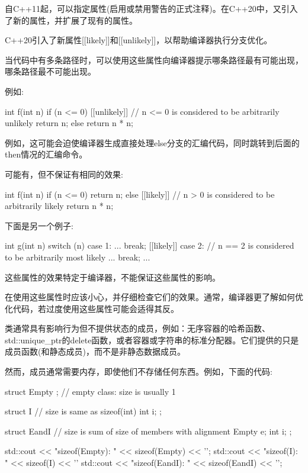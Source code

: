 
自C++11起，可以指定属性(启用或禁用警告的正式注释)。在C++20中，又引入了新的属性，并扩展了现有的属性。

\mySubsubsection{21.6.1}{属性[[likely]]和[unlikely]]}

C++20引入了新属性[[likely]]和[[unlikely]]，以帮助编译器执行分支优化。

当代码中有多条路径时，可以使用这些属性向编译器提示哪条路径最有可能出现，哪条路径最不可能出现。

例如:

\begin{cpp}
int f(int n)
{
	if (n <= 0) [[unlikely]] { // n <= 0 is considered to be arbitrarily unlikely
		return n;
	}
	else {
		return n * n;
	}
}
\end{cpp}

例如，这可能会迫使编译器生成直接处理else分支的汇编代码，同时跳转到后面的then情况的汇编命令。

可能有，但不保证有相同的效果:

\begin{cpp}
int f(int n)
{
	if (n <= 0) {
		return n;
	}
	else [[likely]] { // n > 0 is considered to be arbitrarily likely
		return n * n;
	}
}
\end{cpp}

下面是另一个例子:

\begin{cpp}
int g(int n)
{
	switch (n) {
		case 1:
		...
		break;
		[[likely]] case 2: // n == 2 is considered to be arbitrarily most likely
		...
		break;
	}
	...
}
\end{cpp}

这些属性的效果特定于编译器，不能保证这些属性的影响。

在使用这些属性时应该小心，并仔细检查它们的效果。通常，编译器更了解如何优化代码，若过度使用这些属性可能会适得其反。


类通常具有影响行为但不提供状态的成员，例如：无序容器的哈希函数、std::unique\_ptr的delete函数，或者容器或字符串的标准分配器。它们提供的只是成员函数(和静态成员)，而不是非静态数据成员。

然而，成员通常需要内存，即使他们不存储任何东西。例如，下面的代码:

\begin{cpp}
struct Empty {}; // empty class: size is usually 1

struct I { // size is same as sizeof(int)
	int i;
};

struct EandI { // size is sum of size of members with alignment
	Empty e;
	int i;
};

std::cout << "sizeof(Empty): " << sizeof(Empty) << '\n';
std::cout << "sizeof(I): " << sizeof(I) << '\n'
std::cout << "sizeof(EandI): " << sizeof(EandI) << '\n';
\end{cpp}


